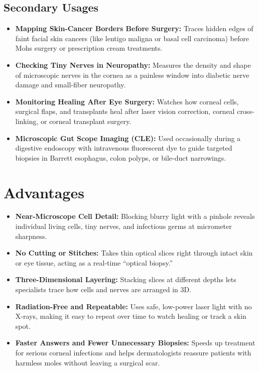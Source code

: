 \subsection{Secondary Usages}
\begin{itemize}
    \item \textbf{Mapping Skin-Cancer Borders Before Surgery:} Traces hidden edges of faint facial skin cancers (like lentigo maligna or basal cell carcinoma) before Mohs surgery or prescription cream treatments.
    \item \textbf{Checking Tiny Nerves in Neuropathy:} Measures the density and shape of microscopic nerves in the cornea as a painless window into diabetic nerve damage and small-fiber neuropathy.
    \item \textbf{Monitoring Healing After Eye Surgery:} Watches how corneal cells, surgical flaps, and transplants heal after laser vision correction, corneal cross-linking, or corneal transplant surgery.
    \item \textbf{Microscopic Gut Scope Imaging (CLE):} Used occasionally during a digestive endoscopy with intravenous fluorescent dye to guide targeted biopsies in Barrett esophagus, colon polyps, or bile-duct narrowings.
\end{itemize}

\section{Advantages}
\begin{itemize}
    \item \textbf{Near-Microscope Cell Detail:} Blocking blurry light with a pinhole reveals individual living cells, tiny nerves, and infectious germs at micrometer sharpness.
    \item \textbf{No Cutting or Stitches:} Takes thin optical slices right through intact skin or eye tissue, acting as a real-time ``optical biopsy.''
    \item \textbf{Three-Dimensional Layering:} Stacking slices at different depths lets specialists trace how cells and nerves are arranged in 3D.
    \item \textbf{Radiation-Free and Repeatable:} Uses safe, low-power laser light with no X-rays, making it easy to repeat over time to watch healing or track a skin spot.
    \item \textbf{Faster Answers and Fewer Unnecessary Biopsies:} Speeds up treatment for serious corneal infections and helps dermatologists reassure patients with harmless moles without leaving a surgical scar.
\end{itemize}

